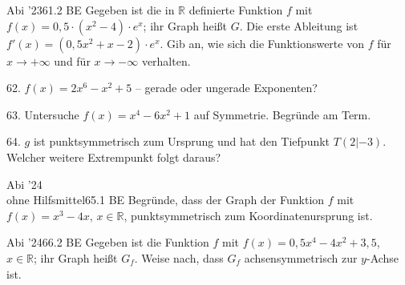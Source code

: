 \documentclass[11pt]{article}
\begin{document}
\begin{pfaufg}{Abi ’23}{61.}{2 BE}
Gegeben ist die in $\mathbb{R}$ definierte Funktion $f$ mit $f(x) = 0{,}5\cdot(x^2 - 4)\cdot e^x$; ihr Graph heißt $G$. Die erste Ableitung ist $f'(x) = (0{,}5x^2 + x - 2)\cdot e^x$. Gib an, wie sich die Funktionswerte von $f$ für $x \to +\infty$ und für $x \to -\infty$ verhalten.
\end{pfaufg}
\begin{pfaufg}{}{62.}{}
$f(x) = 2x^6 - x^2 + 5$ – gerade oder ungerade Exponenten? 
\end{pfaufg}
\pfgruppe{}
\begin{pfaufg}{}{63.}{}
Untersuche $f(x) = x^4 - 6x^2 + 1$ auf Symmetrie. Begründe am Term.
\end{pfaufg}
\pfgruppe{}
\begin{pfaufg}{}{64.}{}
$g$ ist punktsymmetrisch zum Ursprung und hat den Tiefpunkt $T(2 | -3)$. Welcher weitere Extrempunkt folgt daraus?
\end{pfaufg}
\pfgruppe{}
\begin{pfaufg}{Abi ’24\\ohne Hilfsmittel}{65.}{1 BE}
Begründe, dass der Graph der Funktion $f$ mit $f(x) = x^3 - 4x$, $x \in \mathbb{R}$, punktsymmetrisch zum Koordinatenursprung ist.
\end{pfaufg}
\pfgruppe{}
\begin{pfaufg}{Abi ’24}{66.}{2 BE}
Gegeben ist die Funktion $f$ mit $f(x) = 0{,}5x^4 - 4x^2 + 3{,}5$, $x \in \mathbb{R}$; ihr Graph heißt $G_f$. Weise nach, dass $G_f$ achsensymmetrisch zur $y$-Achse ist.
\end{pfaufg}
\pfgruppe{}
\end{document}
